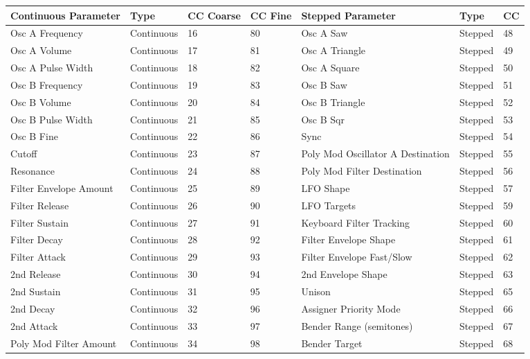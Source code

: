 \begin{longtable}[l]{ p{5cm}|p{2cm}|p{1.5cm}|p{1.5cm}|p{5cm}|p{2cm}|p{1cm}} 
\textbf{Continuous Parameter} & \textbf{Type} & \textbf{CC Coarse} & \textbf{CC Fine} & \textbf{Stepped Parameter} & \textbf{Type} & \textbf{CC} \\ \hline
Osc A Frequency & Continuous & 16 & 80 & Osc A Saw & Stepped & 48 \\ \hline
Osc A Volume & Continuous & 17 & 81 & Osc A Triangle & Stepped & 49 \\ \hline
Osc A Pulse Width & Continuous & 18 & 82 & Osc A Square & Stepped & 50 \\ \hline
Osc B Frequency & Continuous & 19 & 83 & Osc B Saw & Stepped & 51 \\ \hline
Osc B Volume & Continuous & 20 & 84 & Osc B Triangle & Stepped & 52 \\ \hline
Osc B Pulse Width & Continuous & 21 & 85 & Osc B Sqr & Stepped & 53 \\ \hline
Osc B Fine & Continuous & 22 & 86 & Sync & Stepped & 54 \\ \hline
Cutoff & Continuous & 23 & 87 & Poly Mod Oscillator A Destination & Stepped & 55 \\ \hline
Resonance & Continuous & 24 & 88 & Poly Mod Filter Destination & Stepped & 56 \\ \hline
Filter Envelope Amount & Continuous & 25 & 89 & LFO Shape & Stepped & 57 \\ \hline
Filter Release  &  Continuous  & 26 & 90 &  LFO Targets  &  Stepped  &  59 \\ \hline
Filter Sustain  &  Continuous  & 27 & 91 &  Keyboard Filter Tracking  &  Stepped  &  60 \\ \hline
Filter Decay  &  Continuous  & 28 & 92 &  Filter Envelope Shape  &  Stepped  &  61 \\ \hline
Filter Attack  &  Continuous  & 29 & 93 &  Filter Envelope Fast/Slow  &  Stepped  &  62 \\ \hline
2nd Release  &  Continuous  & 30 & 94 &  2nd Envelope Shape  &  Stepped  &  63 \\ \hline
2nd Sustain  &  Continuous  & 31 & 95 &  Unison  &  Stepped  &  65 \\ \hline
2nd Decay  &  Continuous  & 32 & 96 &  Assigner Priority Mode  &  Stepped  &  66 \\ \hline
2nd Attack  &  Continuous  & 33 & 97 &  Bender Range (semitones)  &  Stepped  &  67 \\ \hline
Poly Mod Filter Amount  &  Continuous  & 34 & 98 &  Bender Target  &  Stepped  &  68 \\ \hline

\end{longtable}

